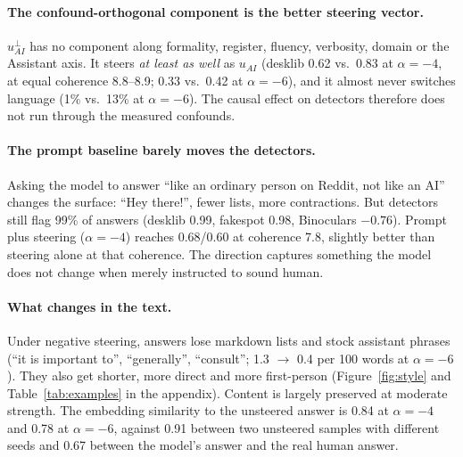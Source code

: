 \paragraph{The confound-orthogonal component is the better steering vector.} $u_{AI}^{\perp}$ has no component along formality, register, fluency, verbosity, domain or the Assistant axis. It steers \emph{at least as well} as $u_{AI}$ (desklib 0.62 vs.\ 0.83 at $\alpha{=}{-}4$, at equal coherence 8.8--8.9; 0.33 vs.\ 0.42 at $\alpha{=}{-}6$), and it almost never switches language (1\% vs.\ 13\% at $\alpha{=}{-}6$). The causal effect on detectors therefore does not run through the measured confounds.

\paragraph{The prompt baseline barely moves the detectors.} Asking the model to answer ``like an ordinary person on Reddit, not like an AI'' changes the surface: ``Hey there!'', fewer lists, more contractions. But detectors still flag 99\% of answers (desklib 0.99, fakespot 0.98, Binoculars $-0.76$). Prompt plus steering ($\alpha{=}{-}4$) reaches 0.68/0.60 at coherence 7.8, slightly better than steering alone at that coherence. The direction captures something the model does not change when merely instructed to sound human.

\paragraph{What changes in the text.} Under negative steering, answers lose markdown lists and stock assistant phrases (``it is important to'', ``generally'', ``consult''; 1.3 $\rightarrow$ 0.4 per 100 words at $\alpha{=}{-}6$). They also get shorter, more direct and more first-person (Figure~\ref{fig:style} and Table~\ref{tab:examples} in the appendix). Content is largely preserved at moderate strength. The embedding similarity to the unsteered answer is 0.84 at $\alpha{=}{-}4$ and 0.78 at $\alpha{=}{-}6$, against 0.91 between two unsteered samples with different seeds and 0.67 between the model's answer and the real human answer.


